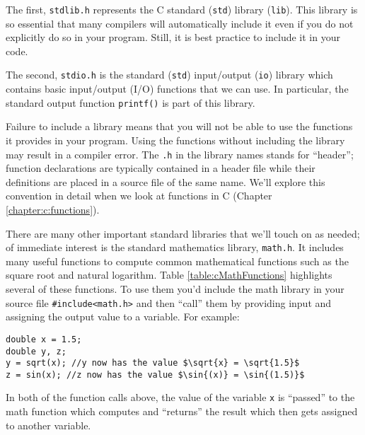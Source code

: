 The first, \texttt{stdlib.h} represents the C standard (\texttt{std}) 
library (\texttt{lib}).  This library is
so essential that many compilers will automatically include it even if you do not
explicitly do so in your program.  Still, it is best practice to include it in your code.

The second, \texttt{stdio.h} is the standard (\texttt{std}) input/output 
(\texttt{io}) library which contains basic input/output (I/O) functions that we can use.  
In particular, the standard output function \texttt{printf()} is part of this library.

Failure to include a library means that you will not be able to use the functions
it provides in your program.  Using the functions without including the library may
result in a compiler error.  The \texttt{.h} in the library names stands for 
``header''; function declarations are typically contained in a header file while 
their definitions are placed in a source file of the same name.  We'll explore
this convention in detail when we look at functions in C (Chapter \ref{chapter:c:functions}).

There are many other important standard libraries that we'll touch on as 
needed; of immediate interest is the standard
mathematics library, \texttt{math.h}.  It includes many useful functions
to compute common mathematical functions such as the square root and 
natural logarithm.  Table \ref{table:cMathFunctions} highlights several of 
these functions.  To use them you'd include the math library in your source
file \texttt{#include<math.h>} and then ``call'' them by providing input 
and assigning the output value to a variable.  For example:

\begin{verbatim}
double x = 1.5;
double y, z;
y = sqrt(x); //y now has the value $\sqrt{x} = \sqrt{1.5}$
z = sin(x); //z now has the value $\sin{(x)} = \sin{(1.5)}$
\end{verbatim}

In both of the function calls above, the value of the variable \texttt{x} is
``passed'' to the math function which computes and ``returns'' the
result which then gets assigned to another variable.

